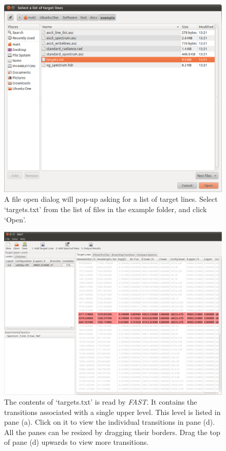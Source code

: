 \documentclass[a4paper,12pt]{report}
\begin{document}
\begin{figure}\centering
\includegraphics[width=140mm]{Tutorial2.eps}
\caption{A file open dialog will pop-up asking for a list of target lines. Select `targets.txt' from the list of files in the example folder, and click `Open'.}
\label{fig:tut2}
\end{figure}

\begin{figure}\centering
\includegraphics[width=140mm]{Tutorial3.eps}
\caption{The contents of `targets.txt' is read by \emph{FAST}. It contains the transitions associated with a single upper level. This level is listed in pane (a). Click on it to view the individual transitions in pane (d). All the panes can be resized by dragging their borders. Drag the top of pane (d) upwards to view more transitions.}
\label{fig:tut3}
\end{figure}
\end{document}
